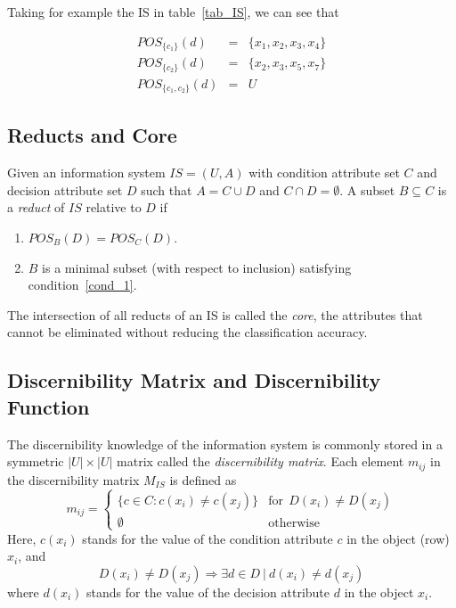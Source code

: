 \documentclass[authoryear,11pt]{elsarticle}
\begin{document}
  Taking for example the IS in table~\ref{tab_IS}, we can see that
  
  $$\begin{array}{lcc}
  POS_{\lbrace c_1 \rbrace}(d)     &=& \lbrace x_1,x_2,x_3,x_4 \rbrace\\
  POS_{\lbrace c_2 \rbrace}(d)     &=& \lbrace x_2,x_3,x_5,x_7 \rbrace\\
  POS_{\lbrace c_1, c_2 \rbrace}(d)&=& U
  \end{array}$$
 
\subsection{Reducts and Core}\label{def_reduct}
  Given an information system $IS=(U,A)$ with condition attribute set $C$ and decision attribute set
  $D$ such that $A=C \cup D$ and $C \cap D =\emptyset$. A subset $B \subseteq C$ is a \textit{reduct} 
  of $IS$ relative to $D$ if
  \begin{enumerate}
  	\item $POS_B(D)=POS_C(D)$. \label{cond_1}
  	\item $B$ is a minimal subset (with respect to inclusion) satisfying condition~\ref{cond_1}.\label{cond_2}
  \end{enumerate}
  
  The intersection of all reducts of an IS is called the \textit{core}, the attributes that cannot be
  eliminated without reducing the classification accuracy.
  
\subsection{Discernibility Matrix and Discernibility Function}
  The discernibility knowledge of the information system is commonly stored in a symmetric $|U| \times |U|$
  matrix called the \textit{discernibility matrix}. Each element $m_{ij}$ in the discernibility matrix 
  $M_{IS}$ is defined as   
  \begin{equation}
  	m_{ij}=\left\lbrace\begin{array}{cl}
  			\lbrace c \in C: c(x_i) \neq c(x_j) \rbrace & \mathrm{for~~}D(x_i) \neq D(x_j)\\
  			\emptyset 								   & \mathrm{otherwise} 
  	\end{array}\right.
  \end{equation}  
  Here, $c(x_i)$ stands for the value of the condition attribute $c$ in the object (row) $x_i$, and 
  $$D(x_i) \neq D(x_j) \Rightarrow \exists d \in D~ |~ d(x_i) \neq d(x_j)$$ 
  where $d(x_i)$ stands for the value  of the decision attribute $d$ in the object $x_i$.
  
\end{document}
